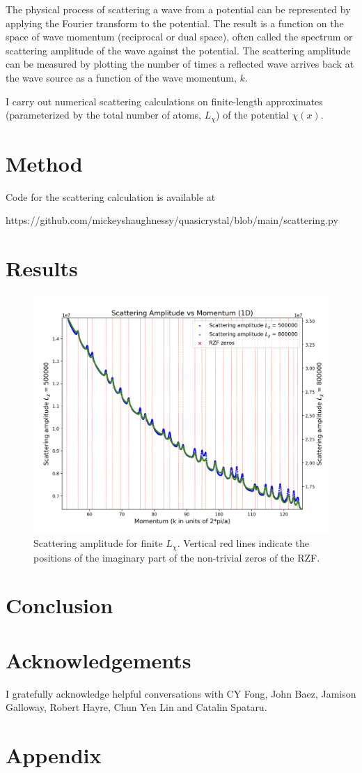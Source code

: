 \documentclass[11pt, oneside]{article}   	%
\begin{document}
The physical process of scattering a wave from a potential can be represented by applying the Fourier transform to the potential. The result is a function on the space of wave momentum (reciprocal or dual space), often called the spectrum or scattering amplitude of the wave against the potential. The scattering amplitude can be measured by plotting the number of times a reflected wave arrives back at the wave source as a function of the wave momentum, $k$.

I carry out numerical scattering calculations on finite-length approximates (parameterized by the total number of atoms, $L_{\chi}$) of the potential $\chi(x)$.


\section{Method}

 Code for the scattering calculation is available at 
 
 https://github.com/mickeyshaughnessy/quasicrystal/blob/main/scattering.py
 
   



\section{Results}
\begin{figure}[htbp]
\begin{center}
    \includegraphics[width=0.8\linewidth]{../images/zoomed_scattering.png}
   
\caption{Scattering amplitude for finite $L_{\chi}$. Vertical red lines indicate the positions of the imaginary part of the non-trivial zeros of the RZF.}
\label{default}
\end{center}
\end{figure}


\section{Conclusion}
\section{Acknowledgements}
I gratefully acknowledge helpful conversations with CY Fong, John Baez, Jamison Galloway, Robert Hayre, Chun Yen Lin and Catalin Spataru.
\section{Appendix}
\end{document}
